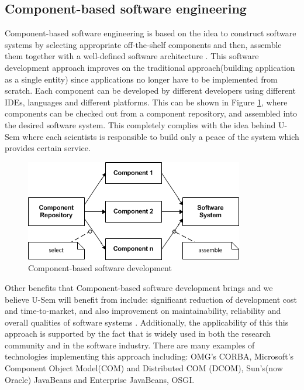 \subsection{Component-based software engineering}

Component-based software engineering is based on the idea to construct software systems by selecting appropriate off-the-shelf components and then, assemble them together with a well-defined software architecture \cite{Pour}. This software development approach improves on the traditional approach(building application as a single entity) since applications no longer have to be implemented from scratch. Each component can be developed by different developers using different IDEs, languages and different platforms. This can be shown in Figure \ref{fig_cbsd}, where components can be checked out from a component repository, and assembled into the desired software system. This completely complies with the idea behind U-Sem where each scientists is responsible to build only a peace of the system which provides certain service.

\begin{figure}[h!]
  \centering
  	\includegraphics[scale=0.75]{plug-in/component-based.png}
  \caption{Component-based software development \cite{Pour} }
  \label{fig_cbsd}
\end{figure}

Other benefits that Component-based software development brings and we believe U-Sem will benefit from include: significant reduction of development cost and time-to-market, and also improvement on maintainability, reliability and overall qualities of software systems \cite{Pour1} \cite{Pour2}. Additionally, the applicability of this this approach is supported by the fact that is widely used in both the research community and in the software industry. There are many examples of technologies implementing this approach including: OMG's CORBA,  Microsoft's Component Object Model(COM) and Distributed COM (DCOM), Sun's(now Oracle) JavaBeans and Enterprise JavaBeans, OSGI.

